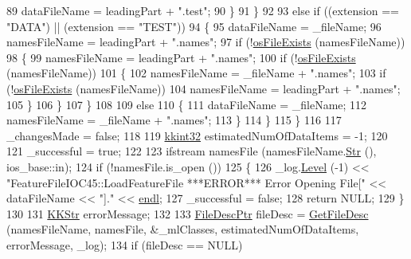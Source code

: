 \begin{DoxyCode}
89             dataFileName  = leadingPart + \textcolor{stringliteral}{".test"};
90         \}
91       \}
92 
93       \textcolor{keywordflow}{else} \textcolor{keywordflow}{if}  ((extension == \textcolor{stringliteral}{"DATA"}) ||  (extension == \textcolor{stringliteral}{"TEST"}))
94       \{
95         dataFileName  = \_fileName;
96         namesFileName = leadingPart + \textcolor{stringliteral}{".names"};
97         \textcolor{keywordflow}{if}  (!\hyperlink{namespace_k_k_b_aba5c7fcb492dea01f2115c492ff65d83}{osFileExists} (namesFileName))
98         \{
99           namesFileName = leadingPart + \textcolor{stringliteral}{".names"};
100           \textcolor{keywordflow}{if}  (!\hyperlink{namespace_k_k_b_aba5c7fcb492dea01f2115c492ff65d83}{osFileExists} (namesFileName))
101           \{
102             namesFileName = \_fileName + \textcolor{stringliteral}{".names"};
103             \textcolor{keywordflow}{if}  (!\hyperlink{namespace_k_k_b_aba5c7fcb492dea01f2115c492ff65d83}{osFileExists} (namesFileName))
104               namesFileName = leadingPart + \textcolor{stringliteral}{".names"};
105           \}
106         \}
107       \}
108 
109       \textcolor{keywordflow}{else}
110       \{
111         dataFileName  = \_fileName;
112         namesFileName = \_fileName + \textcolor{stringliteral}{".names"};
113       \}
114     \}
115   \}
116 
117   \_changesMade = \textcolor{keyword}{false};
118 
119   \hyperlink{namespace_k_k_b_a8fa4952cc84fda1de4bec1fbdd8d5b1b}{kkint32}  estimatedNumOfDataItems = -1;
120   
121   \_successful = \textcolor{keyword}{true};
122 
123   ifstream  namesFile (namesFileName.\hyperlink{class_k_k_b_1_1_k_k_str_ad574e6c0fe7f6ce1ba3ab0a8ce2fbd52}{Str} (), ios\_base::in);
124   \textcolor{keywordflow}{if}  (!namesFile.is\_open ())
125   \{
126     \_log.\hyperlink{class_k_k_b_1_1_run_log_a32cf761d7f2e747465fd80533fdbb659}{Level} (-1) << \textcolor{stringliteral}{"FeatureFileIOC45::LoadFeatureFile   ***ERROR***      Error Opening File["} << 
      dataFileName << \textcolor{stringliteral}{"]."} << \hyperlink{namespace_k_k_b_ad1f50f65af6adc8fa9e6f62d007818a8}{endl};
127     \_successful = \textcolor{keyword}{false};
128     \textcolor{keywordflow}{return}  NULL;
129   \}
130 
131   \hyperlink{class_k_k_b_1_1_k_k_str}{KKStr}  errorMessage;
132   
133   \hyperlink{class_k_k_m_l_l_1_1_file_desc}{FileDescPtr} fileDesc = \hyperlink{class_k_k_m_l_l_1_1_feature_file_i_o_c45_a17aa8ed6fcf2e293af5e018fc12a75d0}{GetFileDesc} (namesFileName, namesFile, &\_mlClasses, 
      estimatedNumOfDataItems, errorMessage, \_log);
134   \textcolor{keywordflow}{if}  (fileDesc == NULL)

\end{DoxyCode}
